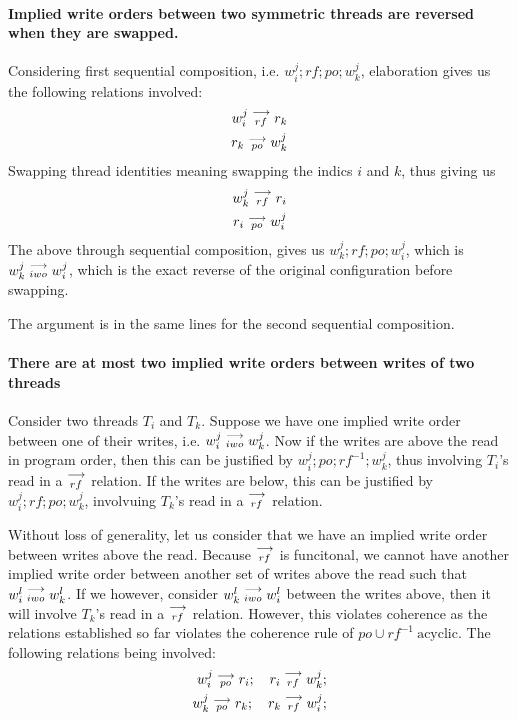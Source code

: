     \paragraph{Implied write orders between two symmetric threads are reversed when they are swapped.}
        Considering first sequential composition, i.e. $w_i^j;rf;po;w_k^j$, elaboration gives us the following relations involved:
        \begin{align}
            w_i^j\stackrel{\longrightarrow}{_{rf}}r_k \\
            r_k\stackrel{\longrightarrow}{_{po}}w_k^j
        \end{align}
        Swapping thread identities meaning swapping the indics $i$ and $k$, thus giving us 
        \begin{align}
            w_k^j\stackrel{\longrightarrow}{_{rf}}r_i \\
            r_i\stackrel{\longrightarrow}{_{po}}w_i^j
        \end{align}
        The above through sequential composition, gives us  $w_k^j;rf;po;w_i^j$, which is $w_k^j\stackrel{\longrightarrow}{_{iwo}}w_i^j$, which is the exact reverse of the original configuration before swapping. 

        The argument is in the same lines for the second sequential composition. 
    
    \paragraph{There are at most two implied write orders between writes of two threads}
        
        Consider two threads $T_i$ and $T_k$. Suppose we have one implied write order between one of their writes, i.e. $w_i^j\stackrel{\longrightarrow}{_{iwo}}w_k^j$. Now if the writes are above the read in program order, then this can be justified by $w_i^j;po;rf^{-1};w_k^j$, thus involving $T_i$'s read in a $\stackrel{\longrightarrow}{_{rf}}$ relation. If the writes are below, this can be justified by $w_i^j;rf;po;w_k^j$, involvuing $T_k$'s read in a $\stackrel{\longrightarrow}{_{rf}}$ relation. 

        Without loss of generality, let us consider that we have an implied write order between writes above the read. Because  $\stackrel{\longrightarrow}{_{rf}}$ is funcitonal, we cannot have another implied write order between another set of writes above the read such that $w_i^l\stackrel{\longrightarrow}{_{iwo}}w_k^l$. If we however, consider $w_k^l\stackrel{\longrightarrow}{_{iwo}}w_i^l$ between the writes above, then it will involve $T_k$'s read in a $\stackrel{\longrightarrow}{_{rf}}$ relation. However, this violates coherence as the relations established so far violates the coherence rule of $po \cup rf^{-1} \ \text{acyclic}$. The following relations being involved: 
        \begin{align}
            w_i^j\stackrel{\longrightarrow}{_{po}}r_i; \quad r_i\stackrel{\longrightarrow}{_{rf}}w_k^j; \\
            w_k^j\stackrel{\longrightarrow}{_{po}}r_k; \quad r_k\stackrel{\longrightarrow}{_{rf}}w_i^j; 
        \end{align} 
        
